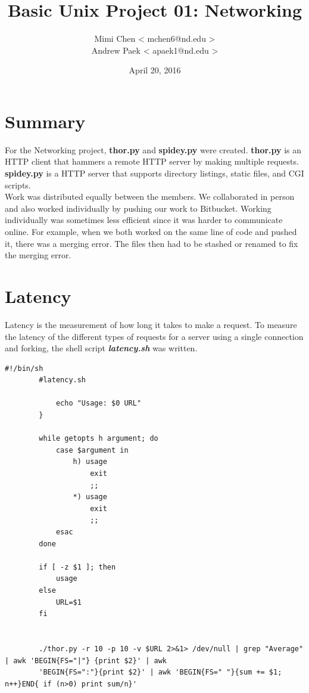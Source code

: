 \documentclass{article}
\title{Basic Unix Project 01: Networking}
\author{Mimi Chen {\textless} mchen6@nd.edu {\textgreater}\\
Andrew Paek {\textless} apaek1@nd.edu {\textgreater}}
\date{April 20, 2016}
\begin{document}
\maketitle

\section*{Summary}

For the Networking project, \textbf{thor.py} and \textbf{spidey.py} were created. \textbf{thor.py} is an HTTP client that hammers a remote HTTP server by making multiple requests. \textbf{spidey.py} is a HTTP server that supports directory listings, static files, and CGI scripts.\\

\noindent Work was distributed equally between the members. We collaborated in person and also worked individually by pushing our work to Bitbucket. Working individually was sometimes less efficient since it was harder to communicate online. For example, when we both worked on the same line of code and pushed it, there was a merging error. The files then had to be stashed or renamed to fix the merging error.


\section*{Latency}
Latency is the measurement of how long it takes to make a request. To measure the latency of the different types of requests for a server using a single connection and forking, the shell script \textbf{\textit{latency.sh}} was written. 

\begin{Verbatim}[fontsize=\footnotesize]
    #!/bin/sh
        #latency.sh

        	echo "Usage: $0 URL"
        }
        
        while getopts h argument; do
        	case $argument in 
        		h) usage
        			exit
        			;;
        		*) usage
        			exit
        			;;
        	esac
        done
        
        if [ -z $1 ]; then
        	usage
        else
        	URL=$1
        fi
        
        
        ./thor.py -r 10 -p 10 -v $URL 2>&1> /dev/null | grep "Average" | awk 'BEGIN{FS="|"} {print $2}' | awk 
        'BEGIN{FS=":"}{print $2}' | awk 'BEGIN{FS=" "}{sum += $1; n++}END{ if (n>0) print sum/n}'

\end{Verbatim}
\end{document}
